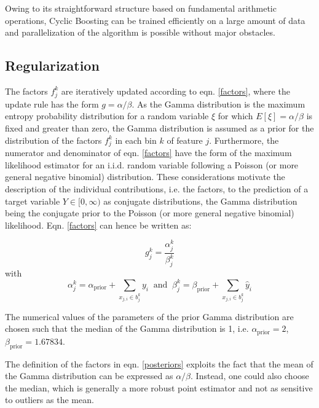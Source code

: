 \documentclass[BCOR=1mm, DIV=calc,10pt,
twoside=true,
twocolumn,
headings=normal]{scrartcl}
\begin{document}
Owing to its straightforward structure based on fundamental arithmetic operations, Cyclic
Boosting can be trained efficiently on a large amount of data and parallelization of the
algorithm is possible without major obstacles.


\subsection{Regularization}
\label{conjugates}

The factors $f^k_j$ are iteratively updated according to eqn. \ref{factors}, where the
update rule has the form $g = \alpha / \beta$. As the Gamma distribution is the maximum
entropy probability distribution for a random variable $\xi$ for which
$E[\xi] = \alpha / \beta$ is fixed and greater than zero, the Gamma distribution is
assumed as a prior for the distribution of the factors $f^k_j$ in each bin $k$ of feature
$j$. Furthermore, the numerator and denominator of eqn. \ref{factors} have the form of the
maximum likelihood estimator for an i.i.d. random variable following a Poisson (or more
general negative binomial) distribution. These considerations motivate the description of
the individual contributions, i.e. the factors, to the prediction of a target variable
$Y \in [0,\infty)$ as conjugate distributions, the Gamma distribution being the conjugate
prior to the Poisson (or more general negative binomial) likelihood. Eqn. \ref{factors}
can hence be written as:

\begin{equation} \label{posteriors}
g^k_j = \frac{\alpha^k_j}{\beta^k_j}
\end{equation}
with
\begin{equation}
\alpha^k_j = \alpha_{\text{prior}} + \sum \limits_{x_{j,i} \in b^k_j} y_i \;\; \mathrm{and} \; \;
\beta^k_j = \beta_{\text{prior}} + \sum \limits_{x_{j,i} \in b^k_j} \hat{y}_i
\end{equation}

\noindent
The numerical values of the parameters of the prior Gamma distribution are chosen such
that the median of the Gamma distribution is 1, i.e. $\alpha_{\text{prior}} = 2$,
$\beta_{\text{prior}} = 1.67834$.

The definition of the factors in eqn. \ref{posteriors} exploits the fact that the mean of
the Gamma distribution can be expressed as $\alpha / \beta$. Instead, one could also
choose the median, which is generally a more robust point estimator and not as sensitive
to outliers as the mean.
\end{document}
